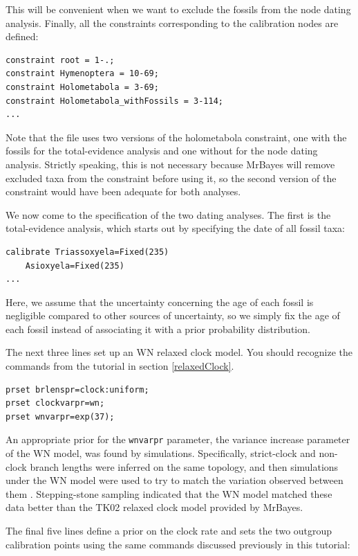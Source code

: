 \documentclass[12pt]{book}
\begin{document}
This will be convenient when we want to exclude the fossils from the node dating analysis. Finally,
all the constraints corresponding to the calibration nodes are defined:

\begin{Verbatim}
constraint root = 1-.;
constraint Hymenoptera = 10-69;
constraint Holometabola = 3-69;
constraint Holometabola_withFossils = 3-114;
...
\end{Verbatim}

Note that the file uses two versions of the holometabola constraint, one with the fossils for the
total-evidence analysis and one without for the node dating analysis. Strictly speaking, this is
not necessary because MrBayes will remove excluded taxa from the constraint before using it, so the
second version of the constraint would have been adequate for both analyses.

We now come to the specification of the two dating analyses. The first is the total-evidence
analysis, which starts out by specifying the date of all fossil taxa:

\begin{Verbatim}
calibrate Triassoxyela=Fixed(235)
    Asioxyela=Fixed(235)
...
\end{Verbatim}

Here, we assume that the uncertainty concerning the age of each fossil is negligible compared to
other sources of uncertainty, so we simply fix the age of each fossil instead of associating it
with a prior probability distribution.

The next three lines set up an WN relaxed clock model. You should recognize the commands from the
tutorial in section \ref{relaxedClock}.

\begin{Verbatim}
prset brlenspr=clock:uniform;
prset clockvarpr=wn;
prset wnvarpr=exp(37);
\end{Verbatim}

An appropriate prior for the \texttt{wnvarpr} parameter, the variance increase parameter of the WN
model, was found by simulations. Specifically, strict-clock and non-clock branch lengths were
inferred on the same topology, and then simulations under the WN model were used to try to match
the variation observed between them \citep{ronquist12b}. Stepping-stone sampling indicated that the
WN model matched these data better than the TK02 relaxed clock model provided by MrBayes.

The final five lines define a prior on the clock rate and sets the two outgroup calibration points
using the same commands discussed previously in this tutorial:
\end{document}
